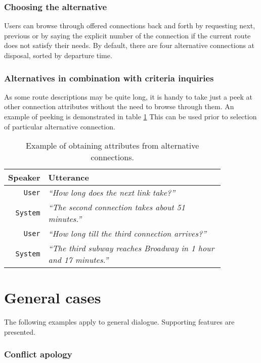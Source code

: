 \subsubsection{Choosing the alternative}

Users can browse through offered connections back and forth by requesting next, previous or by saying the explicit number of the connection if the current route does not satisfy their needs.
By default, there are four alternative connections at disposal, sorted by departure time.


\subsubsection{Alternatives in combination with criteria inquiries}

As some route descriptions may be quite long, it is handy to take just a peek at other connection attributes without the need to browse through them.
An example of peeking is demonstrated in table \ref{table:peek}
This can be used prior to selection of particular alternative connection.

\begin{table}[h]
\centering
\begin{tabular}{ | r | p{0.85\linewidth} | } \hline
	\textbf{Speaker} & \textbf{Utterance} \\ \hline
	\texttt{User} & \textit{``How long does the next link take?''} \\ \hline
	\texttt{System} & \textit{``The second connection takes about 51 minutes.''} \\ \hline
	\texttt{User} & \textit{``How long till the third connection arrives?''} \\ \hline
	\texttt{System} & \textit{``The third subway reaches Broadway in 1 hour and 17 minutes.''} \\ \hline
\end{tabular}
\caption[Alternative attribute peek]{Example of obtaining attributes from alternative connections.}
\label{table:peek}
\end{table}


\section{General cases}

The following examples apply to general dialogue.
Supporting features are presented.

\subsubsection{Conflict apology}

